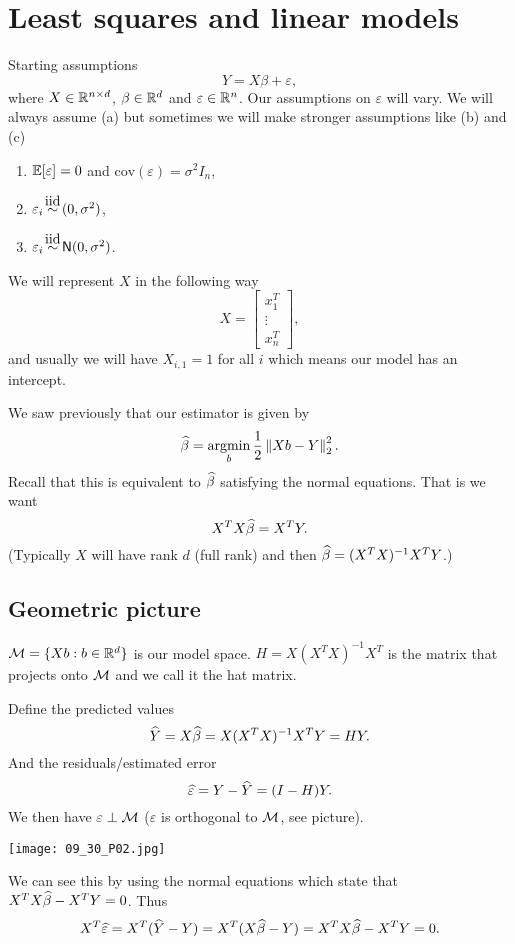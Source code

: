 \section{Least squares and linear models}
Starting assumptions 
\[Y=X\beta + \varepsilon, \]
where $X \in {\mathbb R}^{n \times d}$, $\beta \in {\mathbb R}^d$ and $\varepsilon \in {\mathbb R}^n$. Our assumptions on $\varepsilon$ will vary. We will always assume (a) but sometimes we will make stronger assumptions like (b) and (c)
\begin{enumerate}
    \item ${\mathbb{E}}[\varepsilon] = 0$ and $\text{cov}(\varepsilon) = \sigma^2I_n$,
    \item $\varepsilon_i \iid (0,\sigma^2)$,
    \item $\varepsilon_i \iid \Na(0,\sigma^2)$.
\end{enumerate}
We will represent $X$ in the following way
\[X = \begin{bmatrix}
    x_1^T\\ \vdots \\ x_n^T
\end{bmatrix}, \]
and usually we will have $X_{i,1} = 1$ for all $i$ which means our model has an intercept.

We saw previously that our estimator is given by 
\[\widehat{\beta} = \operatorname*{argmin}_b \frac{1}{2}\left\|Xb - Y\right\|_2^2. \]
Recall that this is equivalent to $\widehat{\beta}$ satisfying the normal equations. That is we want
\[ X^TX\widehat{\beta} = X^TY.\]
(Typically $X$ will have rank $d$ (full rank) and then $\widehat{\beta} = (X^TX)^{-1}X^TY$.)
\subsection{Geometric picture}
${\mathcal{M}} = \{Xb : b \in {\mathbb R}^d\}$ is our model space. $H = X(X^TX)^{-1}X^T$ is the matrix that projects onto ${\mathcal{M}}$ and we call it the hat matrix. 

Define the predicted values \[\widehat{Y} = X\widehat{\beta} = X(X^TX)^{-1}X^T Y = HY.\] And the residuals/estimated error
\[\widehat{\varepsilon}=Y-\widehat{Y} = (I-H)Y.\]
We then have $\varepsilon \perp {\mathcal{M}}$ ($\varepsilon$ is orthogonal to ${\mathcal{M}}$, see picture). 
\begin{center}
    
    \texttt{[image: 09\_30\_P02.jpg]}
    
\end{center}
We can see this by using the normal equations which state that $X^TX\widehat{\beta}-X^TY = 0$. Thus 
\[X^T\widehat{\varepsilon}= X^T(\widehat{Y}-Y) = X^T(X\widehat{\beta}-Y)= X^TX\widehat{\beta}-X^TY =0. \]

